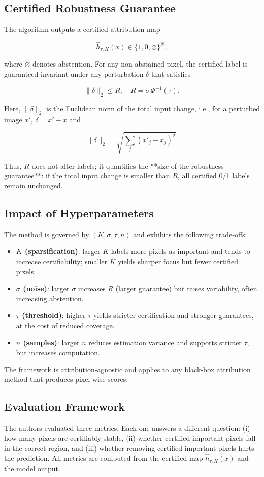 \documentclass[11pt]{article}
\begin{document}
\subsection{Certified Robustness Guarantee}
The algorithm outputs a certified attribution map

$$
\hat{h}_{\tau,K}(x) \in \{1,0,\varnothing\}^N,
$$

where $\varnothing$ denotes abstention. For any non‑abstained pixel, the certified label is guaranteed invariant under any perturbation $\delta$ that satisfies

$$
\|\delta\|_2 \le R,\quad R = \sigma\,\Phi^{-1}(\tau).
$$

Here, $\|\delta\|_2$ is the Euclidean norm of the total input change, i.e., for a perturbed image $x'$, $\delta=x'-x$ and

$$
\|\delta\|_2 = \sqrt{\sum_j (x'_j - x_j)^2}.
$$

Thus, $R$ does not alter labels; it quantifies the **size of the robustness guarantee**: if the total input change is smaller than $R$, all certified 0/1 labels remain unchanged.

\subsection{Impact of Hyperparameters}
The method is governed by $(K,\sigma,\tau,n)$ and exhibits the following trade‑offs:
\begin{itemize}
\item \textbf{$K$ (sparsification)}: larger $K$ labels more pixels as important and tends to increase certifiability; smaller $K$ yields sharper focus but fewer certified pixels.
\item \textbf{$\sigma$ (noise)}: larger $\sigma$ increases $R$ (larger guarantee) but raises variability, often increasing abstention.
\item \textbf{$\tau$ (threshold)}: higher $\tau$ yields stricter certification and stronger guarantees, at the cost of reduced coverage.
\item \textbf{$n$ (samples)}: larger $n$ reduces estimation variance and supports stricter $\tau$, but increases computation.
\end{itemize}
The framework is attribution‑agnostic and applies to any black‑box attribution method that produces pixel‑wise scores.



\subsection{Evaluation Framework}
The authors evaluated three metrics. Each one answers a different question: (i) how many pixels are certifiably stable, (ii) whether certified important pixels fall in the correct region, and (iii) whether removing certified important pixels hurts the prediction. All metrics are computed from the certified map $\hat{h}_{\tau,K}(x)$ and the model output.
\end{document}
